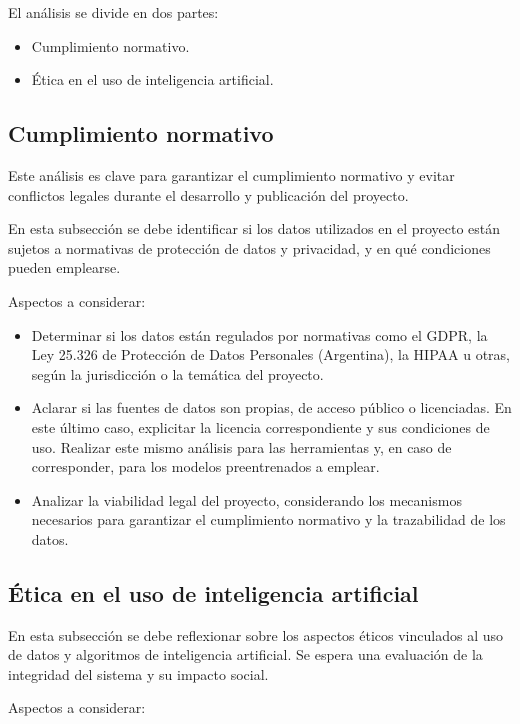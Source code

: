 \documentclass[
11pt, %
]{charter}
\begin{document}
El análisis se divide en dos partes:

\begin{itemize}
  \item Cumplimiento normativo.
  \item Ética en el uso de inteligencia artificial.
\end{itemize}

\subsection{Cumplimiento normativo}
Este análisis es clave para garantizar el cumplimiento normativo y evitar conflictos legales durante el desarrollo y publicación del proyecto.

En esta subsección se debe identificar si los datos utilizados en el proyecto están sujetos a normativas de protección de datos y privacidad, y en qué condiciones pueden emplearse.

Aspectos a considerar:

\begin{itemize}
  \item Determinar si los datos están regulados por normativas como el GDPR, la Ley 25.326 de Protección de Datos Personales (Argentina), la HIPAA u otras, según la jurisdicción o la temática del proyecto.
  \item Aclarar si las fuentes de datos son propias, de acceso público o licenciadas. En este último caso, explicitar la licencia correspondiente y sus condiciones de uso. Realizar este mismo análisis para las herramientas y, en caso de corresponder, para los modelos preentrenados a emplear.
  \item Analizar la viabilidad legal del proyecto, considerando los mecanismos necesarios para garantizar el cumplimiento normativo y la trazabilidad de los datos.
\end{itemize}

\subsection{Ética en el uso de inteligencia artificial}

En esta subsección se debe reflexionar sobre los aspectos éticos vinculados al uso de datos y algoritmos de inteligencia artificial. Se espera una evaluación de la integridad del sistema y su impacto social.

Aspectos a considerar:
\end{document}
